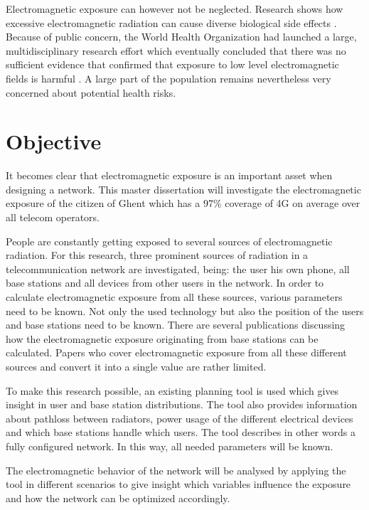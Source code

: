 Electromagnetic exposure can however not be neglected. Research shows how excessive electromagnetic radiation can cause diverse biological side effects \cite{bioeffects}.
Because of public concern, the World Health Organization had launched a large, multidisciplinary research effort which eventually concluded that there was no sufficient evidence that confirmed 
that exposure to low level electromagnetic fields is harmful \cite{WHO}. A large part of the population remains nevertheless very concerned about potential health risks.

\section{Objective}
\label{sec:objective}

It becomes clear that electromagnetic exposure is an important asset when designing a network. This master dissertation will investigate the electromagnetic 
exposure of the citizen of Ghent which has a 97\% coverage of 4G on average over all telecom operators\cite{testaankoop}.

People are constantly getting exposed to several sources of electromagnetic radiation. For this research, three prominent sources of radiation in a telecommunication
network are investigated, being: the user his own phone, all base stations and all devices from other users in the network. In order to calculate electromagnetic 
exposure from all these sources, various parameters need to be known. Not only the used technology but also the position of the users and base stations 
need to be known. There are several publications discussing how the electromagnetic exposure originating from base stations can be calculated. 
Papers who cover electromagnetic exposure from all these different sources and convert it into a single value are rather limited.

To make this research possible, an existing planning tool is used which gives insight in user and base station distributions.
The tool also provides information about pathloss between radiators, power usage of the different electrical devices and which base stations handle which users. The tool describes in other words a fully configured network.
In this way, all needed parameters will be known.

The electromagnetic behavior of the network will be analysed by applying the tool in different scenarios to give insight which variables influence the exposure and how
the network can be optimized accordingly. 

